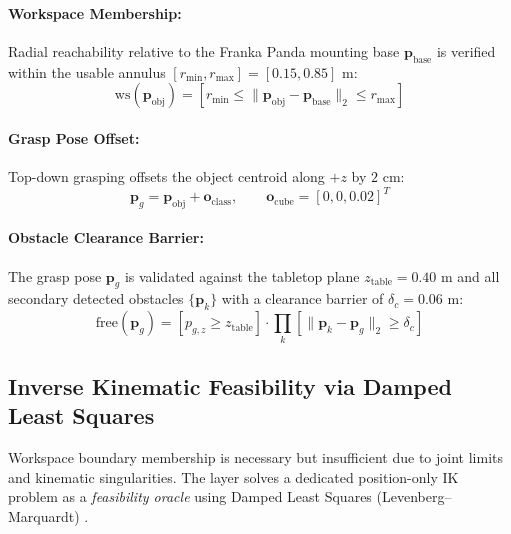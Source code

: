 \documentclass[10pt,a4paper]{article}
\begin{document}
\paragraph{Workspace Membership:}
Radial reachability relative to the Franka Panda mounting base $\mathbf{p}_{\mathrm{base}}$ is verified within the usable annulus $[r_{\min}, r_{\max}] = [0.15, 0.85]\text{ m}$:
\begin{equation}
\mathrm{ws}(\mathbf{p}_{\mathrm{obj}}) = \left[ r_{\min} \le \|\mathbf{p}_{\mathrm{obj}} - \mathbf{p}_{\mathrm{base}}\|_2 \le r_{\max} \right]
\end{equation}

\paragraph{Grasp Pose Offset:}
Top-down grasping offsets the object centroid along $+z$ by $2\text{ cm}$:
\begin{equation}
\mathbf{p}_g = \mathbf{p}_{\mathrm{obj}} + \mathbf{o}_{\mathrm{class}}, \qquad \mathbf{o}_{\mathrm{cube}} = [0, 0, 0.02]^T
\end{equation}

\paragraph{Obstacle Clearance Barrier:}
The grasp pose $\mathbf{p}_g$ is validated against the tabletop plane $z_{\mathrm{table}} = 0.40\text{ m}$ and all secondary detected obstacles $\{\mathbf{p}_k\}$ with a clearance barrier of $\delta_c = 0.06\text{ m}$:
\begin{equation}
\mathrm{free}(\mathbf{p}_g) = \left[ p_{g,z} \ge z_{\mathrm{table}} \right] \cdot \prod_k \left[ \|\mathbf{p}_k - \mathbf{p}_g\|_2 \ge \delta_c \right]
\end{equation}

\subsection{Inverse Kinematic Feasibility via Damped Least Squares}
Workspace boundary membership is necessary but insufficient due to joint limits and kinematic singularities. The layer solves a dedicated position-only IK problem as a \emph{feasibility oracle} using Damped Least Squares (Levenberg--Marquardt) \cite{wampler1986manipulator, nakamura1986inverse, buss2004introduction}.
\end{document}
